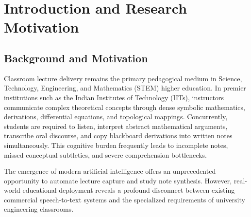 \documentclass[11pt,a4paper,oneside]{report}
\begin{document}
\clearpage

\setcounter{page}{1}

\chapter{Introduction and Research Motivation}
\label{chap:intro}

\section{Background and Motivation}
Classroom lecture delivery remains the primary pedagogical medium in Science, Technology, Engineering, and Mathematics (STEM) higher education. In premier institutions such as the Indian Institutes of Technology (IITs), instructors communicate complex theoretical concepts through dense symbolic mathematics, derivations, differential equations, and topological mappings. Concurrently, students are required to listen, interpret abstract mathematical arguments, transcribe oral discourse, and copy blackboard derivations into written notes simultaneously. This cognitive burden frequently leads to incomplete notes, missed conceptual subtleties, and severe comprehension bottlenecks.

The emergence of modern artificial intelligence offers an unprecedented opportunity to automate lecture capture and study note synthesis. However, real-world educational deployment reveals a profound disconnect between existing commercial speech-to-text systems and the specialized requirements of university engineering classrooms.
\end{document}
